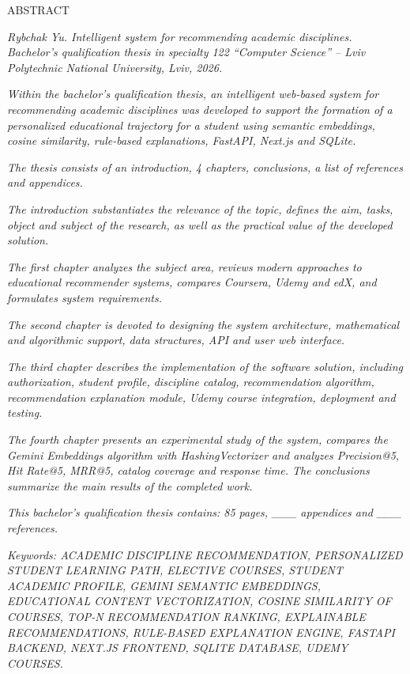 \documentclass[
]{article}
\begin{document}
\protect{}\label{_Toc230434075}{}ABSTRACT

\emph{Rybchak Yu. Intelligent system for recommending academic
disciplines. Bachelor's qualification thesis in specialty 122 ``Computer
Science'' -- Lviv Polytechnic National University, Lviv, 2026.}

\emph{Within the bachelor's qualification thesis, an intelligent
web-based system for recommending academic disciplines was developed to
support the formation of a personalized educational trajectory for a
student using semantic embeddings, cosine similarity, rule-based
explanations, FastAPI, Next.js and SQLite.}

\emph{The thesis consists of an introduction, 4 chapters, conclusions, a
list of references and appendices.}

\emph{The introduction substantiates the relevance of the topic, defines
the aim, tasks, object and subject of the research, as well as the
practical value of the developed solution.}

\emph{The first chapter analyzes the subject area, reviews modern
approaches to educational recommender systems, compares Coursera, Udemy
and edX, and formulates system requirements.}

\emph{The second chapter is devoted to designing the system
architecture, mathematical and algorithmic support, data structures, API
and user web interface.}

\emph{The third chapter describes the implementation of the software
solution, including authorization, student profile, discipline catalog,
recommendation algorithm, recommendation explanation module, Udemy
course integration, deployment and testing.}

\emph{The fourth chapter presents an experimental study of the system,
compares the Gemini Embeddings algorithm with HashingVectorizer and
analyzes Precision@5, Hit Rate@5, MRR@5, catalog coverage and response
time. The conclusions summarize the main results of the completed work.}

\emph{This bachelor's qualification thesis contains: 85 pages, \_\_\_
appendices and \_\_\_ references.}

\emph{Keywords: ACADEMIC DISCIPLINE RECOMMENDATION, PERSONALIZED STUDENT
LEARNING PATH, ELECTIVE COURSES, STUDENT ACADEMIC PROFILE, GEMINI
SEMANTIC EMBEDDINGS, EDUCATIONAL CONTENT VECTORIZATION, COSINE
SIMILARITY OF COURSES, TOP-N RECOMMENDATION RANKING, EXPLAINABLE
RECOMMENDATIONS, RULE-BASED EXPLANATION ENGINE, FASTAPI BACKEND, NEXT.JS
FRONTEND, SQLITE DATABASE, UDEMY COURSES.}
\end{document}
